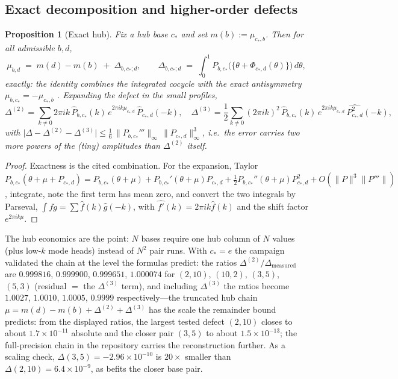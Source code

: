 \documentclass[11pt,a4paper]{article}
\newtheorem{proposition}[theorem]{Proposition}
\theoremstyle{definition}
\theoremstyle{remark}
\begin{document}
\subsection{Exact decomposition and higher-order defects}

\begin{proposition}[Exact hub]\label{prop:hub}
Fix a hub base $c_*$ and set $m(b):=\mu_{c_*,b}$. Then for all admissible $b,d$,
\[
\mu_{b,d}\;=\;m(d)-m(b)\;+\;\Delta_{b,c_*;d},
\qquad
\Delta_{b,c_*;d}\;=\;\int_0^1P_{b,c_*}\bigl(\{\theta+\Phi_{c_*,d}(\theta)\}\bigr)\,d\theta,
\]
exactly: the identity combines the integrated cocycle \cite[Eq.~(39)--(40)]{phaselaw} with
the exact antisymmetry $\mu_{b,c_*}=-\mu_{c_*,b}$ \cite[Thm.~B]{unified}. Expanding the
defect in the small profiles,
\[
\Delta^{(2)}=\sum_{k\ne0}2\pi ik\,\widehat P_{b,c_*}(k)\,e^{2\pi ik\mu_{c_*,d}}\,
\widehat P_{c_*,d}(-k),
\quad
\Delta^{(3)}=\frac12\sum_{k\ne0}(2\pi ik)^2\,\widehat P_{b,c_*}(k)\,
e^{2\pi ik\mu_{c_*,d}}\,\widehat{P_{c_*,d}^{2}}(-k),
\]
with $\bigl|\Delta-\Delta^{(2)}-\Delta^{(3)}\bigr|\le\tfrac16\,
\lVert P_{b,c_*}'''\rVert_\infty\,\lVert P_{c_*,d}\rVert_\infty^3$, i.e.\ the error carries
two more powers of the (tiny) amplitudes than $\Delta^{(2)}$ itself.
\end{proposition}

\begin{proof}
Exactness is the cited combination. For the expansion, Taylor
$P_{b,c_*}(\theta+\mu+P_{c_*,d})=P_{b,c_*}(\theta+\mu)+P_{b,c_*}'(\theta+\mu)P_{c_*,d}
+\tfrac12P_{b,c_*}''(\theta+\mu)P_{c_*,d}^2+O(\lVert P\rVert^3\lVert
P'''\rVert)$, integrate, note the first term has mean zero, and convert the two integrals by
Parseval, $\int fg=\sum\widehat f(k)\widehat g(-k)$, with
$\widehat{f'}(k)=2\pi ik\widehat f(k)$ and the shift factor $e^{2\pi ik\mu}$.
\end{proof}

The hub economics are the point: $N$ bases require one hub column of $N$ values (plus
low-$k$ mode heads) instead of $N^2$ pair runs. With $c_*=e$ the campaign validated the chain
at the level the formulas predict: the ratios $\Delta^{(2)}/\Delta_{\text{measured}}$ are
$0.999816$, $0.999900$, $0.999651$, $1.000074$ for $(2,10)$, $(10,2)$, $(3,5)$, $(5,3)$
(residual $=$ the $\Delta^{(3)}$ term), and including $\Delta^{(3)}$ the ratios become
$1.0027$, $1.0010$, $1.0005$, $0.9999$ respectively---the truncated hub chain
$\mu=m(d)-m(b)+\Delta^{(2)}+\Delta^{(3)}$ has the scale the remainder bound predicts: from
the displayed ratios, the largest tested defect $(2,10)$ closes to about
$1.7\times10^{-11}$ absolute and the closer pair $(3,5)$ to about $1.5\times10^{-13}$;
the full-precision chain in the repository carries the reconstruction further. As a
scaling check, $\Delta(3,5)=-2.96\times10^{-10}$ is $20\times$ smaller than
$\Delta(2,10)=6.4\times10^{-9}$, as befits the closer base pair.
\end{document}
